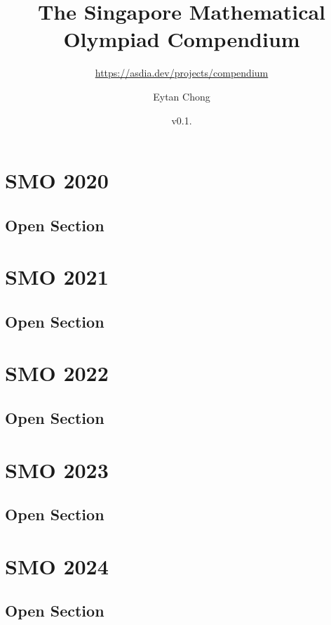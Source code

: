\documentclass[a4paper,listof=totoc,bibliography=totoc,openany]{scrbook}
\title{The Singapore Mathematical Olympiad Compendium}
\subtitle{\url{https://asdia.dev/projects/compendium}}
\author{Eytan Chong}
\date{v0.1.\datetwo}
\begin{document}
\maketitle
\tableofcontents




\chapter{SMO 2020}
\section{Open Section}


\chapter{SMO 2021}
\section{Open Section}


\chapter{SMO 2022}
\section{Open Section}



\chapter{SMO 2023}
\section{Open Section}



\chapter{SMO 2024}
\section{Open Section}


\end{document}
